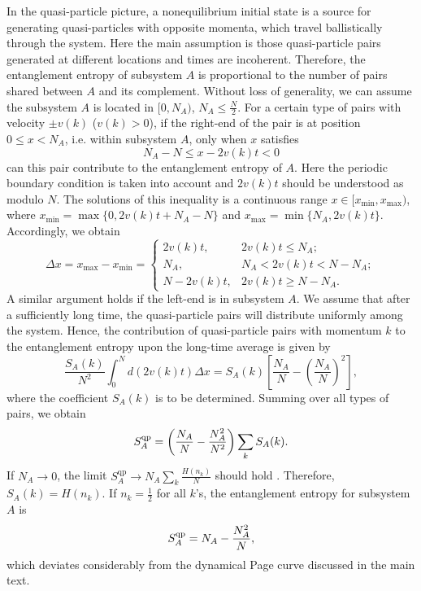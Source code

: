 \documentclass[aps,onecolumn,nofootinbib,superscriptaddress,notitlepage,longbibliography]{revtex4-1}
\begin{document}
In the quasi-particle picture, a nonequilibrium %
initial state is a source for generating quasi-particles
with opposite momenta, which travel ballistically through the system.
Here the main assumption is %
 those quasi-particle pairs generated %
at different locations and times are incoherent. Therefore, the entanglement entropy
of subsystem $A$ is proportional to the number of pairs shared between
$A$ and its complement. Without loss of generality, we can assume
the subsystem $A$ is located in $[0,N_{A})$, $N_{A}\leq\frac{N}{2}$.
For a certain type of pairs with velocity $\pm v(k)$ ($v(k)>0$),
if the right-end of the pair is at position $0\leq x<N_{A}$, i.e.
within subsystem $A$, only when $x$ satisfies
\[
N_{A}-N\leq x-2v(k)t<0
\]
can this pair contribute to the entanglement entropy of $A$. Here the periodic
boundary condition is taken into account and $2v(k)t$ should be understood
as modulo $N$. The solutions of this inequality is a continuous range
$x\in[x_{\mathrm{min}},x_{\mathrm{max}})$, where $x_{\mathrm{min}}=\max\{0,2v(k)t+N_{A}-N\}$ and 
$x_{\mathrm{max}}=\min\{N_{A},2v(k)t\}$. Accordingly, we obtain
\[
\Delta x=x_{\mathrm{max}}-x_{\mathrm{min}}=\begin{cases}
2v(k)t, & 2v(k)t\leq N_{A};\\
N_{A}, & N_{A}<2v(k)t<N-N_{A};\\
N-2v(k)t, & 2v(k)t\geq N-N_{A}.
\end{cases}
\]
A similar argument holds if the left-end is in subsystem $A$. We
assume that after a sufficiently long %
time, the quasi-particle pairs will distribute
uniformly among the system. Hence, %
the contribution of %
quasi-particle pairs with momentum $k$ to the entanglement entropy upon the long-time average is given by %
\[
\frac{S_{A}(k)}{N^{2}}\int_{0}^{N}d(2v(k)t)\Delta x=S_{A}(k)\left[\frac{N_{A}}{N}-\left(\frac{N_{A}}{N}\right)^{2}\right],
\]
where the coefficient $S_A(k)$ is to be determined. Summing over all types of pairs, we obtain 
\[
S^{\rm qp}_{A}=\left(\frac{N_{A}}{N}-\frac{N_{A}^{2}}{N^{2}}\right)\sum_{k}S_{A}(k).
\]
If $N_{A}\to0$, the limit $S_{A}^\mathrm{qp}\to N_{A}\sum_{k}\frac{H(n_{k})}{N}$
should hold \citep{Alba2018}. Therefore, $S_{A}(k)=H(n_{k})$. If
$n_{k}=\frac{1}{2}$ for all $k$'s, the entanglement entropy for subsystem
$A$ is
\[
S^{\rm qp}_{A}=N_{A}-\frac{N_{A}^{2}}{N},
\]
which deviates considerably from %
the dynamical Page curve %
discussed in the main text.

\end{document}

